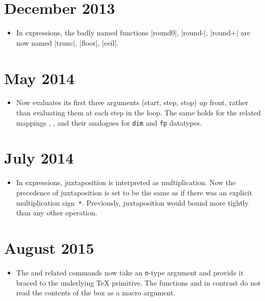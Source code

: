 \documentclass{l3doc}
\begin{document}
\section{December 2013}

\begin{itemize}
  \item In  expressions, the badly named functions |round0|,
    |round-|, |round+| are now named |trunc|, |floor|, |ceil|.
\end{itemize}

\section{May 2014}

\begin{itemize}
  \item Now  evaluates its first three
    arguments (start, step, stop) up front, rather than evaluating them
    at each step in the loop.  The same holds for the related mappings
    , , and their
    analogues for \texttt{dim} and \texttt{fp} datatypes.
\end{itemize}

\section{July 2014}

\begin{itemize}
  \item In  expressions, juxtaposition is interpreted as
    multiplication.  Now the precedence of juxtaposition is set to be
    the same as if there was an explicit multiplication
    sign~\texttt{*}.  Previously, juxtaposition would bound more tightly
    than any other operation.
\end{itemize}

\section{August 2015}

\begin{itemize}
  \item The  and related  commands now take an
    \texttt{n}-type argument and provide it braced to the underlying
    \TeX{} primitive.  The functions  and  in
    contrast do not read the contents of the box as a macro argument.
\end{itemize}
\end{document}
